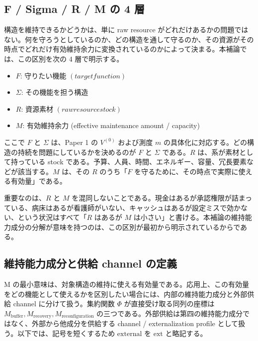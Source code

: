 \documentclass[12pt,a4paper]{article}
\begin{document}
\subsection{F / Sigma / R / M の 4 層}\label{f-sigma-r-m-ux306e-4-ux5c64}

構造を維持できるかどうかは、単に raw resource がどれだけあるかの問題ではない。何を守ろうとしているのか、どの構造を通して守るのか、その資源がその時点でどれだけ有効維持余力に変換されているのかによって決まる。本補論では、この区別を次の 4 層で明示する。

\begin{itemize}
\tightlist
\item
  \(F\): 守りたい機能 \((target function)\)
\item
  \(\Sigma\): その機能を担う構造
\item
  \(R\): 資源素材 \((raw resource stock)\)
\item
  \(M\): 有効維持余力 (effective maintenance amount / capacity)
\end{itemize}

ここで \(F\) と \(\Sigma\) は、Paper 1 の \(V^{(0)}\) および測度 \(m\) の具体化に対応する。どの構造の持続を問題にしているかを決めるのが \(F\) と \(\Sigma\) である。\(R\) は、系が素材として持っている stock である。予算、人員、時間、エネルギー、容量、冗長要素などが該当する。\(M\) は、その \(R\) のうち「\(F\) を守るために、その時点で実際に使える有効量」である。

重要なのは、\(R\) と \(M\) を混同しないことである。現金はあるが承認権限が詰まっている、病床はあるが看護師がいない、キャッシュはあるが設定ミスで効かない、という状況はすべて「\(R\) はあるが \(M\) は小さい」と書ける。本補論の維持能力成分の分解が意味を持つのは、この区別が最初から明示されているからである。

\subsection{維持能力成分と供給 channel の定義}\label{ux7dadux6301ux80fdux529bux6210ux5206ux3068ux4f9bux7d66-channel-ux306eux5b9aux7fa9}

M の最小意味は、対象構造の維持に使える有効量である。応用上、この有効量をどの機能として使えるかを区別したい場合には、内部の維持能力成分と外部供給 channel に分けて扱う。集約関数 \(\Phi\) が直接受け取る同列の座標は \(M_{\mathrm{buffer}}, M_{\mathrm{recovery}}, M_{\mathrm{reconfiguration}}\) の三つである。外部供給は第四の維持能力成分ではなく、外部から他成分を供給する channel / externalization profile として扱う。以下では、記号を短くするため \(\mathrm{external}\) を \(\mathrm{ext}\) と略記する。
\end{document}
